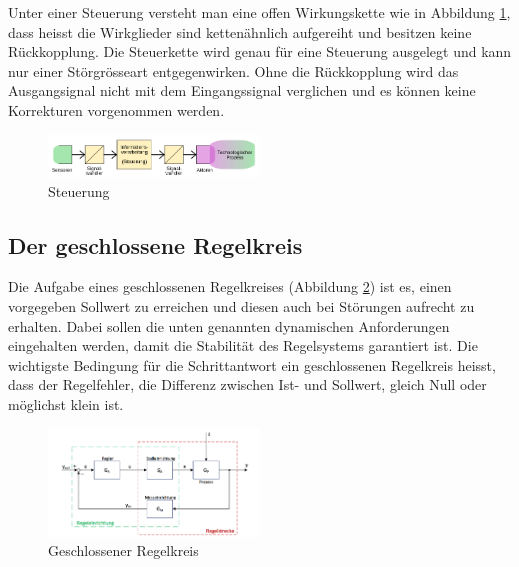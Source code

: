 Unter einer Steuerung  versteht man eine offen Wirkungskette  wie in Abbildung
\ref{fig:Steuerung},   dass  heisst   die  Wirkglieder   sind  ketten\"ahnlich
aufgereiht  und  besitzen  keine R\"uckkopplung. Die  Steuerkette  wird  genau
f\"ur  eine   Steuerung  ausgelegt   und  kann  nur   einer  St\"orgr\"osseart
entgegenwirken. Ohne die  R\"uckkopplung wird das Ausgangsignal  nicht mit dem
Eingangssignal  verglichen  und  es  k\"onnen  keine  Korrekturen  vorgenommen
werden.

\begin{figure}[!h!, width=\pagewidth]
    \begin{center}
    \includegraphics[width=0.5\textwidth]{images/Steuerung}
    \caption{Steuerung}
    \label{fig:Steuerung}
    \end{center}
\end{figure}

\subsection{Der geschlossene Regelkreis}
Die      Aufgabe     eines      geschlossenen     Regelkreises      (Abbildung
\ref{fig:geschlossenerRegelkreis})  ist  es,   einen  vorgegeben  Sollwert  zu
erreichen und diesen  auch bei St\"orungen aufrecht  zu erhalten. Dabei sollen
die unten  genannten dynamischen  Anforderungen eingehalten werden,  damit die
Stabilit\"at des  Regelsystems garantiert ist. Die wichtigste  Bedingung f\"ur
die Schrittantwort ein geschlossenen  Regelkreis heisst, dass der Regelfehler,
die Differenz zwischen  Ist- und Sollwert, gleich Null  oder m\"oglichst klein
ist.


\begin{figure}[!h!, width=\pagewidth]
    \begin{center}
    \includegraphics[width=0.5\textwidth]{images/geschlRegelkreis}
    \caption{Geschlossener Regelkreis}
    \label{fig:geschlossenerRegelkreis}
    \end{center}
\end{figure}

